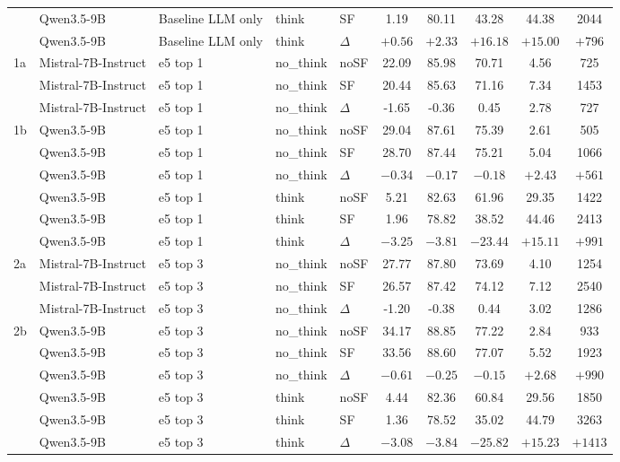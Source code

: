 \begin{scriptsize}
\begin{longtable}{l l l l l c c c c c}
 & Qwen3.5-9B & Baseline LLM only & think & SF & 1.19 & 80.11 & 43.28 & 44.38 & 2044 \\
 & Qwen3.5-9B & Baseline LLM only & think & $\Delta$ & $+0.56$ & $+2.33$ & $+16.18$ & $+15.00$ & $+796$ \\
\dmidrule
1a & Mistral-7B-Instruct & e5 top 1 & no\_think & noSF & 22.09 & 85.98 & 70.71 & 4.56 & 725 \\
 & Mistral-7B-Instruct & e5 top 1 & no\_think & SF & 20.44 & 85.63 & 71.16 & 7.34 & 1453 \\
 & Mistral-7B-Instruct & e5 top 1 & no\_think & $\Delta$ & -1.65 & -0.36 & 0.45 & 2.78 & 727 \\
1b & Qwen3.5-9B & e5 top 1 & no\_think & noSF & 29.04 & 87.61 & 75.39 & 2.61 & 505 \\
 & Qwen3.5-9B & e5 top 1 & no\_think & SF & 28.70 & 87.44 & 75.21 & 5.04 & 1066 \\
 & Qwen3.5-9B & e5 top 1 & no\_think & $\Delta$ & $-0.34$ & $-0.17$ & $-0.18$ & $+2.43$ & $+561$ \\
 & Qwen3.5-9B & e5 top 1 & think & noSF & 5.21 & 82.63 & 61.96 & 29.35 & 1422 \\
 & Qwen3.5-9B & e5 top 1 & think & SF & 1.96 & 78.82 & 38.52 & 44.46 & 2413 \\
 & Qwen3.5-9B & e5 top 1 & think & $\Delta$ & $-3.25$ & $-3.81$ & $-23.44$ & $+15.11$ & $+991$ \\
\dmidrule
2a & Mistral-7B-Instruct & e5 top 3 & no\_think & noSF & 27.77 & 87.80 & 73.69 & 4.10 & 1254 \\
 & Mistral-7B-Instruct & e5 top 3 & no\_think & SF & 26.57 & 87.42 & 74.12 & 7.12 & 2540 \\
 & Mistral-7B-Instruct & e5 top 3 & no\_think & $\Delta$ & -1.20 & -0.38 & 0.44 & 3.02 & 1286 \\
2b & Qwen3.5-9B & e5 top 3 & no\_think & noSF & 34.17 & 88.85 & 77.22 & 2.84 & 933 \\
 & Qwen3.5-9B & e5 top 3 & no\_think & SF & 33.56 & 88.60 & 77.07 & 5.52 & 1923 \\
 & Qwen3.5-9B & e5 top 3 & no\_think & $\Delta$ & $-0.61$ & $-0.25$ & $-0.15$ & $+2.68$ & $+990$ \\
 & Qwen3.5-9B & e5 top 3 & think & noSF & 4.44 & 82.36 & 60.84 & 29.56 & 1850 \\
 & Qwen3.5-9B & e5 top 3 & think & SF & 1.36 & 78.52 & 35.02 & 44.79 & 3263 \\
 & Qwen3.5-9B & e5 top 3 & think & $\Delta$ & $-3.08$ & $-3.84$ & $-25.82$ & $+15.23$ & $+1413$ \\

\end{longtable}
\end{scriptsize}
